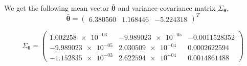 We get the following mean vector $\bar{\bm{\theta}}$ and variance-covariance matrix $\Sigma_{\bm{\theta}}$,
\begin{equation}
	\bar{\bm{\theta}} = 
	\begin{pmatrix}
		6.380560  & 1.168446 & -5.224318 
	\end{pmatrix}^T
\end{equation}

\begin{equation}
	\Sigma_{\bm{\theta}} =
	\begin{pmatrix}
		\num{1.002258e-03} & \num{-9.989023e-05} & \num{-0.0011528352} \\
		\num{-9.989023e-05} & \num{2.030509e-04} & \num{0.0002622594} \\
		\num{-1.152835e-03} & \num{2.622594e-04} & \num{0.0014861488}
	\end{pmatrix}
\end{equation}